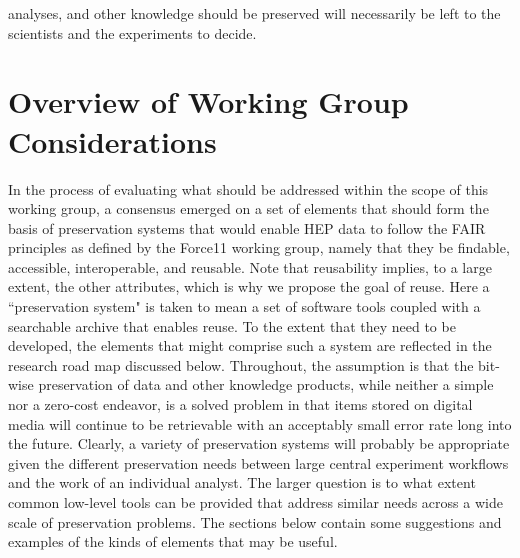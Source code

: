 \documentclass[12pt,a4paper]{article}
\begin{document}
analyses, and other knowledge should be preserved will necessarily be left to the scientists and the experiments to decide.

\hypertarget{WGOverview}{%
\section{Overview of Working Group Considerations}\label{WGOverview}}
In the process of evaluating what should be addressed within the scope of this working group, a consensus emerged on a set of elements that should form the basis of preservation systems that would enable HEP data to follow the FAIR principles as defined by the Force11 working group\cite{F11}, namely that they be findable, accessible, interoperable, and reusable.  Note that reusability implies, to a large extent, the other attributes, which is why we propose the goal of reuse.  Here a ``preservation system" is taken to mean a set of software tools coupled with a searchable archive that enables reuse. To the extent that they need to be developed, the elements that might comprise such a system are reflected in the research road map discussed below.  Throughout, the assumption is that the bit-wise preservation of data and other knowledge products, while neither a simple nor a zero-cost endeavor, is a solved problem in that items stored on digital media will continue to be retrievable with an acceptably small error rate long into the future.  Clearly, a variety of preservation systems will probably be appropriate given the different preservation needs between large central experiment workflows and the work of an individual analyst.  The larger question is to what extent common low-level tools can be provided that address similar needs across a wide scale of preservation problems.  The sections below contain some suggestions and examples of the kinds of elements that may be useful.
\end{document}

